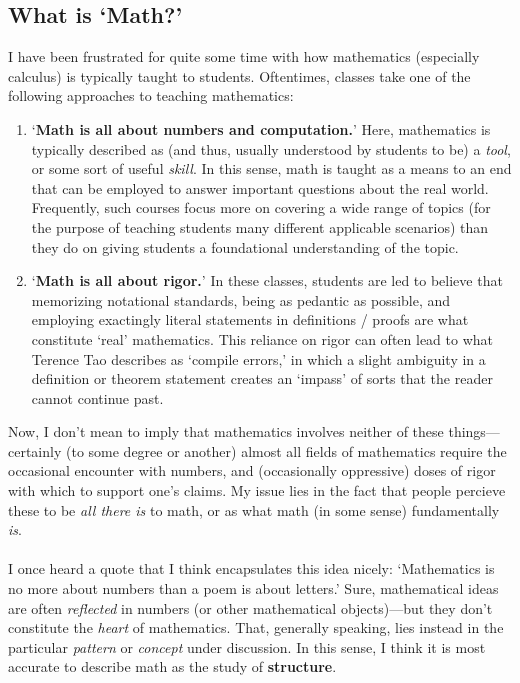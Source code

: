 \documentclass[10pt]{article}
\theoremstyle{definition}
\begin{document}
\subsection{What is `Math?'}
I have been frustrated for quite some time with how mathematics (especially calculus) is typically taught to students.  Oftentimes, classes take one of the following approaches to teaching mathematics:
\begin{enumerate}
    \item `\textbf{Math is all about numbers and computation.}'  Here, mathematics is typically described as (and thus, usually understood by students to be) a \emph{tool}, or some sort of useful \emph{skill}.  In this sense, math is taught as a means to an end that can be employed to answer important questions about the real world.  Frequently, such courses focus more on covering a wide range of topics (for the purpose of teaching students many different applicable scenarios) than they do on giving students a foundational understanding of the topic.
    \item `\textbf{Math is all about rigor.}'  In these classes, students are led to believe that memorizing notational standards, being as pedantic as possible, and employing exactingly literal statements in definitions / proofs are what constitute `real' mathematics.  This reliance on rigor can often lead to what Terence Tao describes as `compile errors,' in which a slight ambiguity in a definition or theorem statement creates an `impass' of sorts that the reader cannot continue past.
\end{enumerate}
Now, I don't mean to imply that mathematics involves neither of these things---certainly (to some degree or another) almost all fields of  mathematics require the occasional encounter with numbers, and (occasionally oppressive) doses of rigor with which to support one's claims.  My issue lies in the fact that people percieve these to be \emph{all there is} to math, or as what math (in some sense) fundamentally \emph{is}.\\~\\
I once heard a quote that I think encapsulates this idea nicely: `Mathematics is no more about numbers than a poem is about letters.'  Sure, mathematical ideas are often \emph{reflected} in numbers (or other mathematical objects)---but they don't constitute the \emph{heart} of mathematics.  That, generally speaking, lies instead in the particular \emph{pattern} or \emph{concept} under discussion.  In this sense, I think it is most accurate to describe math as the study of \textbf{structure}.  \\~\\
\end{document}
